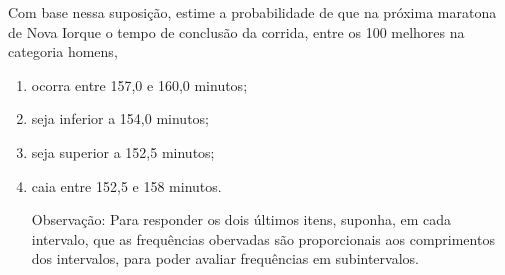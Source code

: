 Com base nessa suposição, estime a probabilidade de que na próxima maratona de Nova Iorque o tempo de conclusão da corrida, entre os 100 melhores na categoria homens,
\begin{enumerate}
\item {} 
ocorra entre 157,0 e 160,0 minutos;

\item {} 
seja inferior a 154,0 minutos;

\item {} 
seja superior a 152,5 minutos;

\item {} 
caia entre 152,5 e 158 minutos.

Observação: Para responder os dois últimos itens, suponha, em cada intervalo, que as frequências obervadas são proporcionais aos comprimentos dos intervalos, para poder avaliar frequências em subintervalos.

\end{enumerate}
